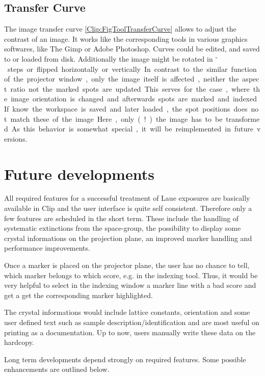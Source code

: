 \subsection{Transfer Curve}

\label{Clip:SecTransferCurve}

The image transfer curve \ref{Clip:FigToolTransferCurve} allows to
adjust the contrast of an image. It works like the corresponding tools
in various graphics softwares, like The Gimp or Adobe Photoshop.
Curves could be edited, and saved to or loaded from disk. Additionally
the image might be rotated in \unit[90]{$^\circ$} steps or flipped
horizontally or vertically. In contrast to the similar function of the
projector window, only the image itself is affected, neither the
aspect ratio not the marked spots are updated. This serves for the
case, where the image orientation is changed and afterwards spots are
marked and indexed. If know the workspace is saved and later loaded,
the spot positions does not match these of the image. Here, only (!)
the image has to be transformed. As this behavior is somewhat special,
it will be reimplemented in future versions.


\section{Future developments}


All required features for a successful treatment of Laue exposures are
basically available in Clip and the user interface is quite self
consistent. Therefore only a few features are scheduled in the short
term. These include the handling of systematic extinctions from the
space-group, the possibility to display some crystal informations on
the projection plane, an improved marker handling and performance
improvements. 

Once a marker is placed on the projector plane, the user has no chance
to tell, which marker belongs to which score, e.g. in the indexing
tool. Thus, it would be very helpful to select in the indexing window
a marker line with a bad score and get a get the corresponding marker
highlighted.

The crystal informations would include lattice
constants, orientation and some user defined text such as sample
description/identification and are most useful on printing as a
documentation. Up to now, users manually write these data on the
hardcopy. 

Long term developments depend strongly on required features. Some
possible enhancements are outlined below.

